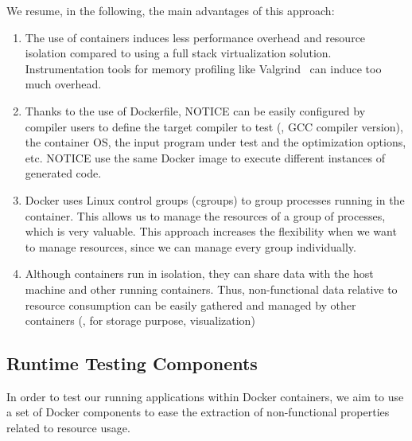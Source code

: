 We resume, in the following, the main advantages of this approach:
\begin{enumerate}
	\item The use of containers induces less performance overhead and resource isolation compared to using a full stack virtualization solution. Instrumentation tools for memory profiling like Valgrind~\cite{nethercote2007valgrind} can induce too much overhead.
	\item Thanks to the use of Dockerfile, NOTICE can be easily configured by compiler users to define the target compiler to test (\eg, GCC compiler version), the container OS, the input program under test and the optimization options, etc. NOTICE use the same Docker image to execute different instances of generated code.
	\item Docker uses Linux control groups (cgroups) to group processes running in the container. This allows us to manage the resources of a group of processes, which is very valuable. 
	This approach increases the flexibility when we want to manage resources, since we can manage every group individually. 
	\item Although containers run in isolation, they can share data with the host machine and other running containers. Thus, non-functional data relative to resource consumption can be easily gathered and managed by other containers (\eg, for storage purpose, visualization)
\end{enumerate}


\subsection{Runtime Testing Components}
In order to test our running applications within Docker containers, we aim to use a set of Docker components to ease the extraction of non-functional properties related to resource usage.
